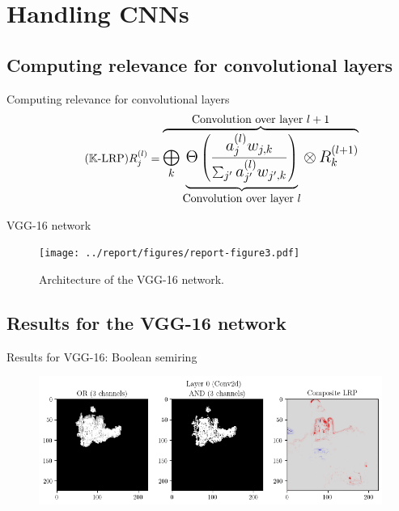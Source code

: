\documentclass[aspectratio=169]{beamer}
\theoremstyle{definition}
\begin{document}
\section{Handling CNNs}
\subsection{Computing relevance for convolutional layers}
\begin{frame}{Computing relevance for convolutional layers}
    \begin{equation}
        \tag{$\mathbb{K}$-LRP}
        \Large
        {R^{(l)}_j = \overbrace{
            \bigoplus_k \underbrace{\Theta\left(
                \frac{a^{(l)}_jw_{j, k}}{\sum_{j'}a^{(l)}_{j'}w_{j', k}}
            \right)}
            _{\text{Convolution over layer $l$}} \otimes\, R^{(l+1)}_k}^{\text{\normalsize Convolution over layer $l+1$}}}
    \end{equation}
\end{frame}

\begin{frame}{VGG-16 network}
    \begin{figure}
        \centering
        \texttt{[image: ../report/figures/report-figure3.pdf]}
        \caption{Architecture of the VGG-16 network.}
        \label{fig:vgg-architecture}
    \end{figure}
\end{frame}

\subsection{Results for the VGG-16 network}
\begin{frame}{Results for VGG-16: Boolean semiring}
    \begin{figure}[H]
        \centering
        \includegraphics[width=\textwidth]{vgg-boolean.png}
    \end{figure}
\end{frame}
\end{document}
